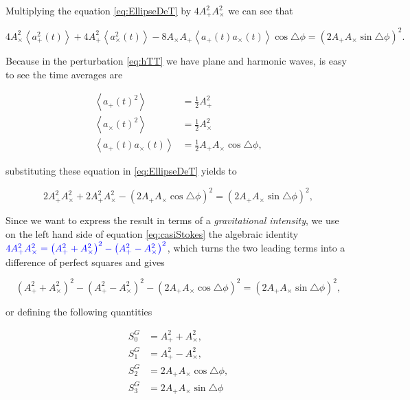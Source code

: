             Multiplying the equation \ref{eq:EllipseDeT} by $4A_+^2A_{\times}^2$ we can see that 

            \begin{equation}
                4A_{\times}^2\left<a_+^2(t)\right> + 4A_+^2\left<a_{\times}^2(t)\right> - 8 A_{\times}A_+\left<a_+(t)a_{\times}(t)\right>\cos\triangle\phi = (2A_+A_{\times}\sin\triangle\phi)^2.
            \end{equation}

            Because in the perturbation \ref{eq:hTT} we have plane and harmonic waves, is easy to see the time averages are

            \begin{align}
                \left<a_+(t)^2\right> &= \frac{1}{2}A_+^2\\
                \left<a_{\times}(t)^2\right> &= \frac{1}{2}A_{\times}^2\\
                \left<a_+(t)a_{\times}(t)\right> &= \frac{1}{2}A_+A_{\times}\cos\triangle\phi,
            \end{align}

            substituting these equation in \ref{eq:EllipseDeT} yields to

            \begin{equation}\label{eq:casiStokes}
                2A_+^2A_{\times}^2 + 2A_+^2A_{\times}^2 - (2A_+A_{\times}\cos\triangle\phi)^2 = (2A_+A_{\times}\sin\triangle\phi)^2,
            \end{equation}

            Since we want to express the result in terms of a \textit{gravitational intensity}, we use on the left hand side of equation \ref{eq:casiStokes} the algebraic identity ${\color{blue}4A_+^2A_{\times}^2 = \left(A_+^2+A_{\times}^2\right)^2 - \left(A_+^2-A_{\times}^2\right)^2}$, which turns the two leading terms into a difference of perfect squares and gives

            \begin{equation}\label{eq:StokesEq}
                (A_+^2+A_{\times}^2)^2 - (A_+^2-A_{\times}^2)^2-(2A_+A_{\times}\cos\triangle\phi)^2=(2A_+A_{\times}\sin\triangle\phi)^2,
            \end{equation}

            or defining the following quantities

            \begin{align}
                S^G_0 &=A_+^2+A_{\times}^2,\\
                S^G_1 &= A_+^2-A_{\times}^2,\\
                S^G_2 &= 2A_+A_{\times}\cos\triangle\phi,\\
                S^G_3 &= 2A_+A_{\times}\sin\triangle\phi
            \end{align}

